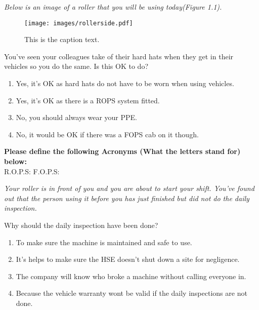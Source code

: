 \newpage
\begin{Scenario}
\textit{Below is an image of a roller that you will be using today(Figure 1.1).}
\end{Scenario}
\vspace{10px}
\begin{figure}[h] 
	\centering 	\texttt{[image: images/rollerside.pdf]}
	\caption{This is the caption text.}
	\label{fig:dumpside}
\end{figure}
\vspace{10px}

\begin{exercise}
    You've seen your colleagues take of their hard hats when they get in their vehicles so you do the same. Is this OK to do?
\end{exercise}

 \begin{enumerate}[A] %
     \item Yes, it's OK as hard hats do not have to be worn when using vehicles.
     \item Yes, it's OK as there is a ROPS system fitted.
     \item No, you should always wear your PPE.
     \item No, it would be OK if there was a FOPS cab on it though.
 \end{enumerate}

\textbf{Please define the following Acronyms (What the letters stand for) below:} \\
\subitem  R.O.P.S: \dotfill
\vspace{10px}
\subitem  F.O.P.S: \dotfill


\begin{Scenario}
\textit{Your roller is in front of you and you are about to start your shift. You've found out that the person using it before you has just finished but did not do the daily inspection.}
\end{Scenario}

\begin{exercise}
     Why should the daily inspection have been done?
\end{exercise}

 \begin{enumerate}[A] %
     \item To make sure the machine is maintained and safe to use.
     \item It's helps to make sure the HSE doesn't shut down a site for negligence.
     \item The company will know who broke a machine without calling everyone in.
     \item Because the vehicle warranty wont be valid if the daily inspections are not done.
 \end{enumerate}
 
